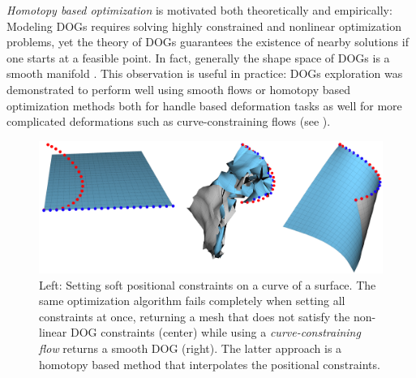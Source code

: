 \emph{Homotopy based optimization} is motivated both theoretically and empirically: Modeling DOGs requires solving highly constrained and nonlinear optimization problems, yet the theory of DOGs guarantees the existence of nearby solutions if one starts at a feasible point. In fact, generally the shape space of DOGs is a smooth manifold \cite{rabi2018shape}. This observation is useful in practice: DOGs exploration was demonstrated to perform well using smooth flows or homotopy based optimization methods both for handle based deformation tasks as well for more complicated deformations such as curve-constraining flows \cite{rabi2018shape} (see ).
\begin{figure} [h]
	\centering
	\includegraphics[width=0.8\linewidth]{figures/homotopy_curve}
	\caption{Left: Setting soft positional constraints on a curve of a surface. The same optimization algorithm fails completely when setting all constraints at once, returning a mesh that does not satisfy the non-linear DOG constraints (center) while using a \textit{curve-constraining flow} \cite{rabi2018shape} returns a smooth DOG (right). The latter approach is a homotopy based method that interpolates the positional constraints.} 
	\label{fig:homotopy_curve}
\end{figure}

